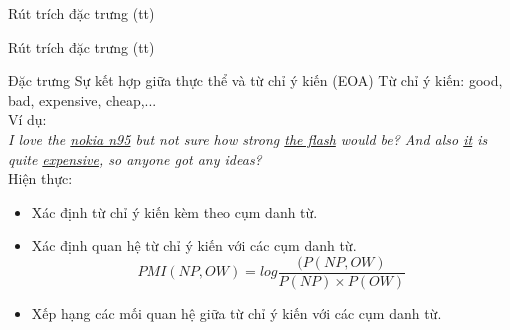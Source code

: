 \documentclass[9pt,xcolor=table,hyperref=unicode]{beamer}
\begin{document}
	\begin{frame}{Rút trích đặc trưng (tt)}		
		\begin{table}[]		
		\parbox{\textwidth}{
			\centering			
			\fontsize{8pt}{10}\selectfont		
				
			\caption{Các đặc trưng được sử dụng trong hệ thống \footnotemark \textsuperscript{,} \footnotemark}
		}
		\end{table}					
	\end{frame}	

	\begin{frame}{Rút trích đặc trưng (tt)}
		\begin{block}{Đặc trưng Sự kết hợp giữa thực thể và từ chỉ ý kiến (EOA)}			
			Từ chỉ ý kiến: good, bad, expensive, cheap,... \\ 
			Ví dụ:\\
			\textit{I love the \underline{nokia n95} but not sure how strong \underline{the flash} would be? And also \underline{it} is quite \underline{expensive}, so anyone got any ideas?} \\
			Hiện thực:
				\begin{itemize}
					\item{Xác định từ chỉ ý kiến kèm theo cụm danh từ.}
					\item{Xác định quan hệ từ chỉ ý kiến với các cụm danh từ. 
						\begin{equation*}
						PMI(NP,OW) = log\frac{(P(NP,OW)}{P(NP)\times P(OW)}
						\end{equation*}
				}
					\item{Xếp hạng các mối quan hệ giữa từ chỉ ý kiến với các cụm danh từ.}
				\end{itemize}

		\end{block}	
	\end{frame}
\end{document}
